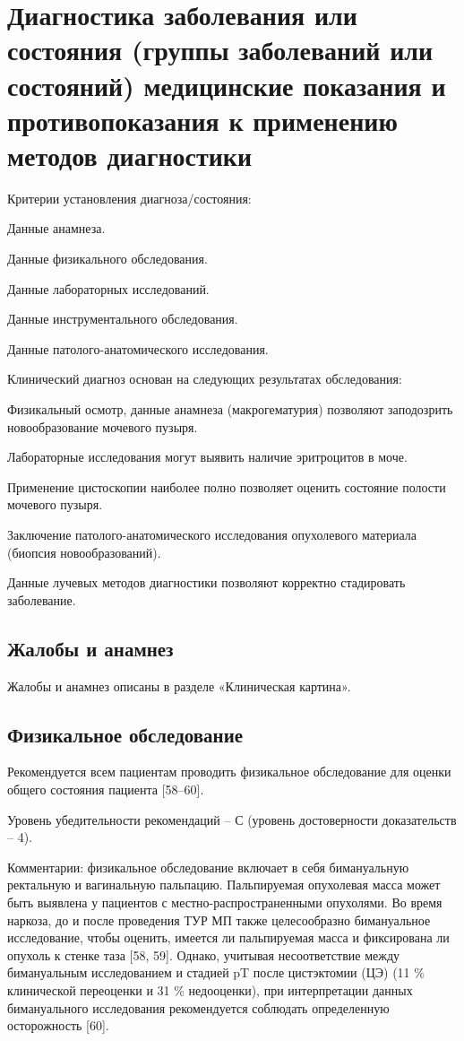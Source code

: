 \section{Диагностика заболевания или состояния (группы заболеваний или состояний) медицинские показания и противопоказания к применению методов диагностики}
\label{sec:Method}
Критерии установления диагноза/состояния:

Данные анамнеза.

Данные физикального обследования.

Данные лабораторных исследований.

Данные инструментального обследования.

Данные патолого-анатомического исследования.

Клинический диагноз основан на следующих результатах обследования:

Физикальный осмотр, данные анамнеза (макрогематурия) позволяют заподозрить новообразование мочевого пузыря.

Лабораторные исследования могут выявить наличие эритроцитов в моче.

Применение цистоскопии наиболее полно позволяет оценить состояние полости мочевого пузыря.

Заключение патолого-анатомического исследования опухолевого материала (биопсия новообразований).

Данные лучевых методов диагностики позволяют корректно стадировать заболевание.

\subsection{Жалобы и анамнез}
\label{sec:}
Жалобы и анамнез описаны в разделе «Клиническая картина».


\subsection{Физикальное обследование}
\label{sec:}
Рекомендуется всем пациентам проводить физикальное обследование для оценки общего состояния пациента [58–60].

Уровень убедительности рекомендаций – С (уровень достоверности доказательств – 4).

Комментарии: физикальное обследование включает в себя бимануальную ректальную и вагинальную пальпацию. Пальпируемая опухолевая масса может быть выявлена у пациентов с местно-распространенными опухолями. Во время наркоза, до и после проведения ТУР МП также целесообразно бимануальное исследование, чтобы оценить, имеется ли пальпируемая масса и фиксирована ли опухоль к стенке таза [58, 59]. Однако, учитывая несоответствие между бимануальным исследованием и стадией pT после цистэктомии (ЦЭ) (11 \% клинической переоценки и 31 \% недооценки), при интерпретации данных бимануального исследования рекомендуется соблюдать определенную осторожность [60].

